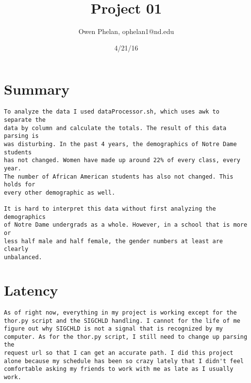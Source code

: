 \documentclass{article}
\title{Project 01}
\date{4/21/16}
\author{Owen Phelan, ophelan1@nd.edu}
\begin{document}
	\maketitle
	\section{Summary}
	\begin{verbatim}
To analyze the data I used dataProcessor.sh, which uses awk to separate the 
data by column and calculate the totals. The result of this data parsing is 
was disturbing. In the past 4 years, the demographics of Notre Dame students 
has not changed. Women have made up around 22% of every class, every year. 
The number of African American students has also not changed. This holds for
every other demographic as well. 

It is hard to interpret this data without first analyzing the demographics
of Notre Dame undergrads as a whole. However, in a school that is more or 
less half male and half female, the gender numbers at least are clearly 
unbalanced. 

	\end{verbatim}
	\section{Latency}
	\begin{verbatim}
As of right now, everything in my project is working except for the thor.py script and the SIGCHLD handling. I cannot for the life of me 
figure out why SIGCHLD is not a signal that is recognized by my computer. As for the thor.py script, I still need to change up parsing the 
request url so that I can get an accurate path. I did this project alone because my schedule has been so crazy lately that I didn't feel comfortable asking my friends to work with me as late as I usually work.

	\end{verbatim}
	\newpage
\end{document}
